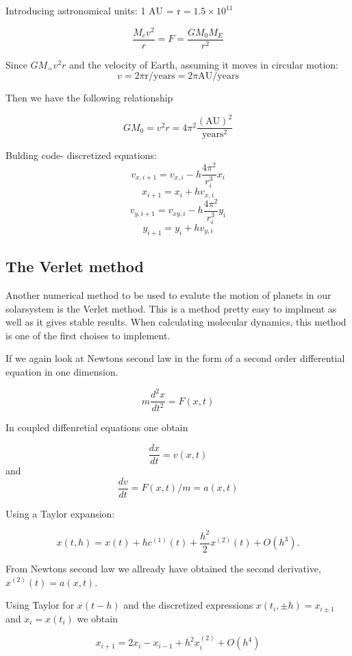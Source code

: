 \documentclass[../main.tex]{subfiles}
\begin{document}
Introducing astronomical units: 1 $\text{AU = r} = 1.5 \times 10^{11}$

\begin{equation}
  \frac{M_ev^2}{r} = F = \frac{GM_0M_E}{r^2}
\end{equation}

Since $GM_=  v^2r$ and the velocity of Earth, assuming it moves in circular motion: $$v = 2\pi \text{r/years}= 2\pi \text{AU/years}$$

Then we have the following relationship

$$GM_0 = v^2r = 4\pi^2 \frac{(\text{AU})^2}{\text{years}^2}$$

Bulding code- discretized equations:
$$v_{x,i+1} = v_{x,i} - h \frac{4\pi^2}{r_i^3}x_i$$
$$x_{i+1} = x_{i} + hv_{x,i}$$
$$v_{y,i+1} = v_{xy,i} - h \frac{4\pi^2}{r_i^3}y_i$$
$$y_{i+1} = y_{i} + hv_{y,i}$$

\subsection{The Verlet method}
Another numerical method to be used to evalute the motion of planets in our solarsystem is the Verlet method. This is a method pretty easy to implment as well as it gives stable results. When calculating molecular dynamics, this method is one of the first choises to implement.

If we again look at Newtons second law in the form of a second order differential equation in one dimension.

\begin{equation}
 m \frac{d^2x}{dt^2} = F(x,t)
\end{equation}

In coupled diffenretial equations one obtain

$$\frac{dx}{dt} = v(x,t)$$    and     $$\frac{dv}{dt} = F(x,t)/m = a(x,t)$$

Using a Taylor expansion:

\begin{equation}
 x(t,h) = x(t) + hc^{(1)}(t) + \frac{h^2}{2}x^{(2)}(t) + O(h^3).
\end{equation}

From Newtons second law we allready have obtained the second derivative, $x^{(2)}(t) = a(x,t)$.

Using Taylor for $x(t-h)$ and the discretized expressions $x(t_i,\pm h) = x_{i \pm 1}$ and $x_i = x(t_i)$ we obtain

\begin{equation}
  x_{i+1} = 2x_i - x_{i-1} + h^2 x_i^{(2)} + O(h^4)
\end{equation}
\end{document}
